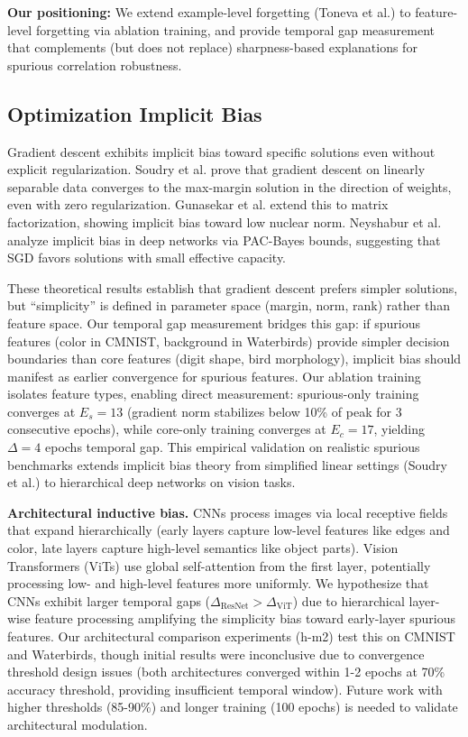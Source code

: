 \textbf{Our positioning:} We extend example-level forgetting (Toneva et al.) to feature-level forgetting via ablation training, and provide temporal gap measurement that complements (but does not replace) sharpness-based explanations for spurious correlation robustness.

\subsection{Optimization Implicit Bias}

Gradient descent exhibits implicit bias toward specific solutions even without explicit regularization. Soudry et al. \cite{soudry2018implicit} prove that gradient descent on linearly separable data converges to the max-margin solution in the direction of weights, even with zero regularization. Gunasekar et al. \cite{gunasekar2018implicit} extend this to matrix factorization, showing implicit bias toward low nuclear norm. Neyshabur et al. \cite{neyshabur2015path} analyze implicit bias in deep networks via PAC-Bayes bounds, suggesting that SGD favors solutions with small effective capacity.

These theoretical results establish that gradient descent prefers simpler solutions, but ``simplicity'' is defined in parameter space (margin, norm, rank) rather than feature space. Our temporal gap measurement bridges this gap: if spurious features (color in CMNIST, background in Waterbirds) provide simpler decision boundaries than core features (digit shape, bird morphology), implicit bias should manifest as earlier convergence for spurious features. Our ablation training isolates feature types, enabling direct measurement: spurious-only training converges at $E_s=13$ (gradient norm stabilizes below 10\% of peak for 3 consecutive epochs), while core-only training converges at $E_c=17$, yielding $\Delta=4$ epochs temporal gap. This empirical validation on realistic spurious benchmarks extends implicit bias theory from simplified linear settings (Soudry et al.) to hierarchical deep networks on vision tasks.

\textbf{Architectural inductive bias.} CNNs process images via local receptive fields that expand hierarchically (early layers capture low-level features like edges and color, late layers capture high-level semantics like object parts). Vision Transformers (ViTs) \cite{dosovitskiy2021image} use global self-attention from the first layer, potentially processing low- and high-level features more uniformly. We hypothesize that CNNs exhibit larger temporal gaps ($\Delta_{\text{ResNet}} > \Delta_{\text{ViT}}$) due to hierarchical layer-wise feature processing amplifying the simplicity bias toward early-layer spurious features. Our architectural comparison experiments (h-m2) test this on CMNIST and Waterbirds, though initial results were inconclusive due to convergence threshold design issues (both architectures converged within 1-2 epochs at 70\% accuracy threshold, providing insufficient temporal window). Future work with higher thresholds (85-90\%) and longer training (100 epochs) is needed to validate architectural modulation.

